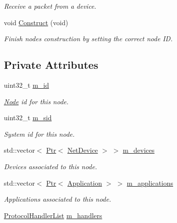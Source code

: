 \begin{DoxyCompactItemize}
\begin{DoxyCompactList}\small\item\em Receive a packet from a device. \end{DoxyCompactList}\item 
void \hyperlink{classns3_1_1Node_a42d5825649aeb147d7e5e49067b4bcb7}{Construct} (void)
\begin{DoxyCompactList}\small\item\em Finish node\textquotesingle{}s construction by setting the correct node ID. \end{DoxyCompactList}\end{DoxyCompactItemize}
\subsection*{Private Attributes}
\begin{DoxyCompactItemize}
\item 
uint32\+\_\+t \hyperlink{classns3_1_1Node_a4aedbd7c03591acdcf48a4f79818dba1}{m\+\_\+id}
\begin{DoxyCompactList}\small\item\em \hyperlink{classns3_1_1Node}{Node} id for this node. \end{DoxyCompactList}\item 
uint32\+\_\+t \hyperlink{classns3_1_1Node_aa6c9e7e8168f6da55df608b5a884b112}{m\+\_\+sid}
\begin{DoxyCompactList}\small\item\em System id for this node. \end{DoxyCompactList}\item 
std\+::vector$<$ \hyperlink{classns3_1_1Ptr}{Ptr}$<$ \hyperlink{classns3_1_1NetDevice}{Net\+Device} $>$ $>$ \hyperlink{classns3_1_1Node_af0ba0670e62825e6953317a7a028aa40}{m\+\_\+devices}
\begin{DoxyCompactList}\small\item\em Devices associated to this node. \end{DoxyCompactList}\item 
std\+::vector$<$ \hyperlink{classns3_1_1Ptr}{Ptr}$<$ \hyperlink{classns3_1_1Application}{Application} $>$ $>$ \hyperlink{classns3_1_1Node_a3984bdbc05cc8a6d2eda6c41963f16f6}{m\+\_\+applications}
\begin{DoxyCompactList}\small\item\em Applications associated to this node. \end{DoxyCompactList}\item 
\hyperlink{classns3_1_1Node_a338edb0211416a2ec60a2988c527f729}{Protocol\+Handler\+List} \hyperlink{classns3_1_1Node_ab83de89d6f361c6fbb3a92f03523b8d0}{m\+\_\+handlers}

\end{DoxyCompactItemize}
